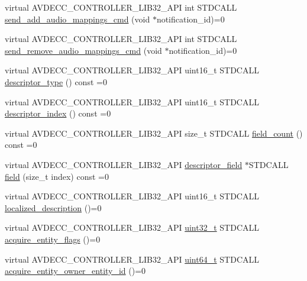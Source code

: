 \begin{DoxyCompactItemize}
\item 
virtual A\+V\+D\+E\+C\+C\+\_\+\+C\+O\+N\+T\+R\+O\+L\+L\+E\+R\+\_\+\+L\+I\+B32\+\_\+\+A\+PI int S\+T\+D\+C\+A\+LL \hyperlink{classavdecc__lib_1_1stream__port__input__descriptor_a5d94b5190eaba5a650afd90d6e483d72}{send\+\_\+add\+\_\+audio\+\_\+mappings\+\_\+cmd} (void $\ast$notification\+\_\+id)=0
\item 
virtual A\+V\+D\+E\+C\+C\+\_\+\+C\+O\+N\+T\+R\+O\+L\+L\+E\+R\+\_\+\+L\+I\+B32\+\_\+\+A\+PI int S\+T\+D\+C\+A\+LL \hyperlink{classavdecc__lib_1_1stream__port__input__descriptor_ae22529f0333bc3efc10d16ecb3700cd5}{send\+\_\+remove\+\_\+audio\+\_\+mappings\+\_\+cmd} (void $\ast$notification\+\_\+id)=0
\item 
virtual A\+V\+D\+E\+C\+C\+\_\+\+C\+O\+N\+T\+R\+O\+L\+L\+E\+R\+\_\+\+L\+I\+B32\+\_\+\+A\+PI uint16\+\_\+t S\+T\+D\+C\+A\+LL \hyperlink{classavdecc__lib_1_1descriptor__base_a5112b70022171063ec5d3242bee9910e}{descriptor\+\_\+type} () const =0
\item 
virtual A\+V\+D\+E\+C\+C\+\_\+\+C\+O\+N\+T\+R\+O\+L\+L\+E\+R\+\_\+\+L\+I\+B32\+\_\+\+A\+PI uint16\+\_\+t S\+T\+D\+C\+A\+LL \hyperlink{classavdecc__lib_1_1descriptor__base_a7eed5583bffdf72d89021b188648c1b5}{descriptor\+\_\+index} () const =0
\item 
virtual A\+V\+D\+E\+C\+C\+\_\+\+C\+O\+N\+T\+R\+O\+L\+L\+E\+R\+\_\+\+L\+I\+B32\+\_\+\+A\+PI size\+\_\+t S\+T\+D\+C\+A\+LL \hyperlink{classavdecc__lib_1_1descriptor__base_ab1edf4996377ed957088a7b3b16aca7d}{field\+\_\+count} () const =0
\item 
virtual A\+V\+D\+E\+C\+C\+\_\+\+C\+O\+N\+T\+R\+O\+L\+L\+E\+R\+\_\+\+L\+I\+B32\+\_\+\+A\+PI \hyperlink{classavdecc__lib_1_1descriptor__field}{descriptor\+\_\+field} $\ast$S\+T\+D\+C\+A\+LL \hyperlink{classavdecc__lib_1_1descriptor__base_aa3716832eed0b6f6dcfba358c5d2c601}{field} (size\+\_\+t index) const =0
\item 
virtual A\+V\+D\+E\+C\+C\+\_\+\+C\+O\+N\+T\+R\+O\+L\+L\+E\+R\+\_\+\+L\+I\+B32\+\_\+\+A\+PI uint16\+\_\+t S\+T\+D\+C\+A\+LL \hyperlink{classavdecc__lib_1_1descriptor__base_a1fb9de45567df344090a1407aa6b775f}{localized\+\_\+description} ()=0
\item 
virtual A\+V\+D\+E\+C\+C\+\_\+\+C\+O\+N\+T\+R\+O\+L\+L\+E\+R\+\_\+\+L\+I\+B32\+\_\+\+A\+PI \hyperlink{parse_8c_a6eb1e68cc391dd753bc8ce896dbb8315}{uint32\+\_\+t} S\+T\+D\+C\+A\+LL \hyperlink{classavdecc__lib_1_1descriptor__base_a42f2a796375edd05c8d29856c018042d}{acquire\+\_\+entity\+\_\+flags} ()=0
\item 
virtual A\+V\+D\+E\+C\+C\+\_\+\+C\+O\+N\+T\+R\+O\+L\+L\+E\+R\+\_\+\+L\+I\+B32\+\_\+\+A\+PI \hyperlink{parse_8c_aec6fcb673ff035718c238c8c9d544c47}{uint64\+\_\+t} S\+T\+D\+C\+A\+LL \hyperlink{classavdecc__lib_1_1descriptor__base_a6480d803970d505ce7a9b429a6eb71bd}{acquire\+\_\+entity\+\_\+owner\+\_\+entity\+\_\+id} ()=0

\end{DoxyCompactItemize}
